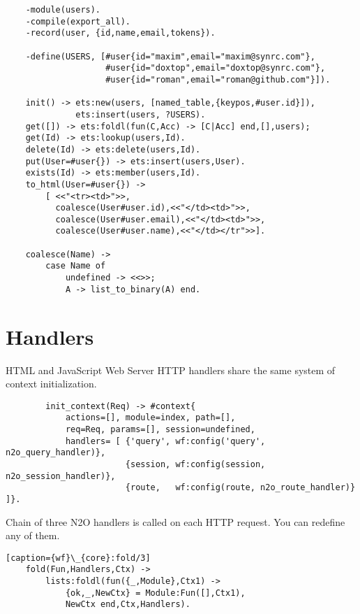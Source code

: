 \vspace{1\baselineskip}
\begin{lstlisting}
    -module(users).
    -compile(export_all).
    -record(user, {id,name,email,tokens}).

    -define(USERS, [#user{id="maxim",email="maxim@synrc.com"},
                    #user{id="doxtop",email="doxtop@synrc.com"},
                    #user{id="roman",email="roman@github.com"}]).

    init() -> ets:new(users, [named_table,{keypos,#user.id}]),
              ets:insert(users, ?USERS).
    get([]) -> ets:foldl(fun(C,Acc) -> [C|Acc] end,[],users);
    get(Id) -> ets:lookup(users,Id).
    delete(Id) -> ets:delete(users,Id).
    put(User=#user{}) -> ets:insert(users,User).
    exists(Id) -> ets:member(users,Id).
    to_html(User=#user{}) ->
        [ <<"<tr><td>">>,
          coalesce(User#user.id),<<"</td><td>">>,
          coalesce(User#user.email),<<"</td><td>">>,
          coalesce(User#user.name),<<"</td></tr">>].

    coalesce(Name) -> 
        case Name of 
            undefined -> <<>>;
            A -> list_to_binary(A) end.
\end{lstlisting}
\vspace{1\baselineskip}

\section{Handlers}
HTML and JavaScript Web Server HTTP handlers share the same system
of context initialization. 

\vspace{1\baselineskip}
\begin{lstlisting}
        init_context(Req) -> #context{
            actions=[], module=index, path=[],
            req=Req, params=[], session=undefined,
            handlers= [ {'query', wf:config('query', n2o_query_handler)},
                        {session, wf:config(session, n2o_session_handler)},
                        {route,   wf:config(route, n2o_route_handler)} ]}.
\end{lstlisting}
\vspace{1\baselineskip}

Chain of three N2O handlers is called
on each HTTP request. You can redefine any of them.

\vspace{1\baselineskip}
\begin{lstlisting}[caption={wf}\_{core}:fold/3]
    fold(Fun,Handlers,Ctx) ->
        lists:foldl(fun({_,Module},Ctx1) ->
            {ok,_,NewCtx} = Module:Fun([],Ctx1),
            NewCtx end,Ctx,Handlers).
\end{lstlisting}
\vspace{1\baselineskip}

